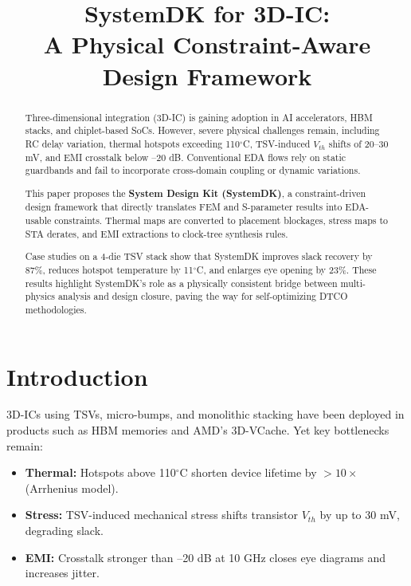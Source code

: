 \documentclass[conference]{IEEEtran}
\begin{document}
\title{SystemDK for 3D-IC:\\
A Physical Constraint-Aware Design Framework}

\author{
}

\maketitle

\begin{abstract}
Three-dimensional integration (3D-IC) is gaining adoption in AI accelerators, HBM stacks, and chiplet-based SoCs. However, severe physical challenges remain, including RC delay variation, thermal hotspots exceeding 110$^\circ$C, TSV-induced $V_{th}$ shifts of 20--30 mV, and EMI crosstalk below --20 dB. Conventional EDA flows rely on static guardbands and fail to incorporate cross-domain coupling or dynamic variations.

This paper proposes the \textbf{System Design Kit (SystemDK)}, a constraint-driven design framework that directly translates FEM and S-parameter results into EDA-usable constraints. Thermal maps are converted to placement blockages, stress maps to STA derates, and EMI extractions to clock-tree synthesis rules. 

Case studies on a 4-die TSV stack show that SystemDK improves slack recovery by 87\%, reduces hotspot temperature by 11$^\circ$C, and enlarges eye opening by 23\%. These results highlight SystemDK’s role as a physically consistent bridge between multi-physics analysis and design closure, paving the way for self-optimizing DTCO methodologies.
\end{abstract}

\section{Introduction}
3D-ICs using TSVs, micro-bumps, and monolithic stacking have been deployed in products such as HBM memories and AMD’s 3D-VCache. Yet key bottlenecks remain:
\begin{itemize}
  \item \textbf{Thermal:} Hotspots above 110$^\circ$C shorten device lifetime by $>10\times$ (Arrhenius model).
  \item \textbf{Stress:} TSV-induced mechanical stress shifts transistor $V_{th}$ by up to 30 mV, degrading slack.
  \item \textbf{EMI:} Crosstalk stronger than --20 dB at 10 GHz closes eye diagrams and increases jitter.
\end{itemize}
\end{document}
